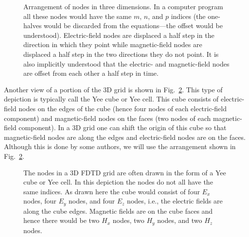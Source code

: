 \begin{figure}
  \begin{center}
  \end{center} \caption{Arrangement of nodes in three dimensions.  In
  a computer program all these nodes would have the same $m$, $n$, and
  $p$ indices (the one-halves would be discarded from the
  equations---the offset would be understood).  Electric-field nodes
  are displaced a half step in the direction in which they point while
  magnetic-field nodes are displaced a half step in the two directions
  they do not point.  It is also implicitly understood that the
  electric- and magnetic-field nodes are offset from each other a half
  step in time.}  \label{fig:nodes3d}
\end{figure}

Another view of a portion of the 3D grid is shown in Fig.\
\ref{fig:yeeCube}.  This type of depiction is typically call the Yee
cube or Yee cell.  This cube consists of electric-field nodes on the
edges of the cube (hence four nodes of each electric-field component)
and magnetic-field nodes on the faces (two nodes of each
magnetic-field component).  In a 3D grid one can shift the origin of
this cube so that magnetic-field nodes are along the edges and
electric-field nodes are on the faces.  Although this is done by some
authors, we will use the arrangement shown in Fig.\
\ref{fig:yeeCube}.

\begin{figure}
  \begin{center}
   \end{center}
  \caption{The nodes in a 3D FDTD grid are often drawn in the form of
  a Yee cube or Yee cell.  In this depiction the nodes do not all have
  the same indices.  As drawn here the cube would consist of four
  $E_x$ nodes, four $E_y$ nodes, and four $E_z$ nodes, i.e., the
  electric fields are along the cube edges.  Magnetic fields are on
  the cube faces and hence there would be two $H_x$ nodes, two $H_y$
  nodes, and two $H_z$ nodes.}  \label{fig:yeeCube}
\end{figure}

